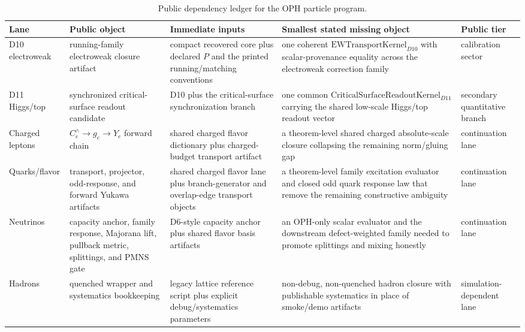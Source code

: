 \documentclass[11pt]{article}
\begin{document}
\begingroup
\small
\setlength{\tabcolsep}{3pt}
\begin{longtable}{@{}>{\raggedright\arraybackslash}p{}>{\raggedright\arraybackslash}p{}>{\raggedright\arraybackslash}p{}>{\raggedright\arraybackslash}p{}>{\raggedright\arraybackslash}p{}@{}}
\caption{Public dependency ledger for the OPH particle program.}\\
\toprule
Lane & Public object & Immediate inputs & Smallest stated missing object & Public tier \\
\midrule
\endhead
\bottomrule
\endfoot
D10 electroweak & running-family electroweak closure artifact & compact recovered core plus declared \(P\) and the printed running/matching conventions & one coherent \(\mathrm{EWTransportKernel}_{D10}\) with scalar-provenance equality across the electroweak correction family & calibration sector \\
D11 Higgs/top & synchronized critical-surface readout candidate & D10 plus the critical-surface synchronization branch & one common \(\mathrm{CriticalSurfaceReadoutKernel}_{D11}\) carrying the shared low-scale Higgs/top readout vector & secondary quantitative branch \\
Charged leptons & \(C_e^{\wedge} \to g_e \to Y_e\) forward chain & shared charged flavor dictionary plus charged-budget transport artifact & a theorem-level shared charged absolute-scale closure collapsing the remaining norm/gluing gap & continuation lane \\
Quarks/flavor & transport, projector, odd-response, and forward Yukawa artifacts & shared charged flavor lane plus branch-generator and overlap-edge transport objects & a theorem-level family excitation evaluator and closed odd quark response law that remove the remaining constructive ambiguity & continuation lane \\
Neutrinos & capacity anchor, family response, Majorana lift, pullback metric, splittings, and PMNS gate & D6-style capacity anchor plus shared flavor basis artifacts & an OPH-only scalar evaluator and the downstream defect-weighted family needed to promote splittings and mixing honestly & continuation lane \\
Hadrons & quenched wrapper and systematics bookkeeping & legacy lattice reference script plus explicit debug/systematics parameters & non-debug, non-quenched hadron closure with publishable systematics in place of smoke/demo artifacts & simulation-dependent lane \\
\end{longtable}
\endgroup
\end{document}

